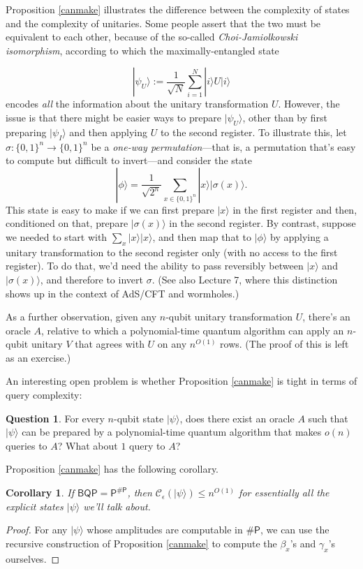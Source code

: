 \documentclass[11pt]{report}
\theoremstyle{plain}
\newtheorem{corollary}[theorem]{Corollary}
\theoremstyle{definition}
\newtheorem{question}[theorem]{Question}
\renewcommand{\ket}[1]{|#1\rangle}
\newcommand{\sizee}{\ensuremath{\mathcal{C}_\epsilon}}
\begin{document}
Proposition \ref{canmake} illustrates the difference between the complexity of states and the complexity of unitaries.  Some people assert that the two must be equivalent to each other, because of the so-called {\em Choi-Jamiolkowski isomorphism}, according to which the maximally-entangled state

\[
\ket{\psi_U} := \frac{1}{\sqrt{N}} \sum_{i=1}^N \ket{i} U \ket{i}
\]
encodes {\em all} the information about the unitary transformation $U$.  However, the issue is that there might be easier ways to prepare $\ket{\psi_U}$, other than by first preparing $\ket{\psi_I}$ and then applying $U$ to the second register.  To illustrate this, let $\sigma:\{0,1\}^n\rightarrow \{0,1\}^n$ be a {\em one-way permutation}---that is, a permutation that's easy to compute but difficult to invert---and consider the state
$$ \ket{\phi} = \frac{1}{\sqrt{2^n}} \sum_{x\in \{0,1\}^n} \ket{x} \ket{\sigma(x)}. $$
This state is easy to make if we can first prepare $\ket{x}$ in the first register and then, conditioned on that, prepare $\ket{\sigma(x)}$ in the second register.  By contrast, suppose we needed to start with $\sum_x \ket{x}\ket{x}$, and then map that to $\ket{\phi}$ by applying a unitary transformation to the second register only (with no access to the first register).  To do that, we'd need the ability to pass reversibly between $\ket{x}$ and $\ket{\sigma(x)}$, and therefore to invert $\sigma$.  (See also Lecture 7, where this distinction shows up in the context of AdS/CFT and wormholes.)

As a further observation, given any $n$-qubit unitary transformation $U$, there's an oracle $A$, relative to which a polynomial-time quantum algorithm can apply an $n$-qubit unitary $V$ that agrees with $U$ on any $n^{O(1)}$ rows. (The proof of this is left as an exercise.)

An interesting open problem is whether Proposition \ref{canmake} is tight in terms of query complexity:

\begin{question}
For every $n$-qubit state $\ket{\psi}$, does there exist an oracle $A$ such that $\ket{\psi}$ can be prepared by a polynomial-time quantum algorithm that makes $o(n)$ queries to $A$?  What about $1$ query to $A$?
\end{question}

Proposition \ref{canmake} has the following corollary.

\begin{corollary}
\label{makecor}
If $\mathsf{BQP}=\mathsf{P^{\#P}}$, then $\sizee(\ket{\psi}) \leq n^{O(1)}$ for essentially all the explicit states $\ket{\psi}$ we'll talk about.
\end{corollary}
\begin{proof}
For any $\ket{\psi}$ whose amplitudes are computable in $\mathsf{\#P}$, we can use the recursive construction of Proposition \ref{canmake} to compute the $\beta_x$'s and $\gamma_x$'s ourselves.
\end{proof}
\end{document}
